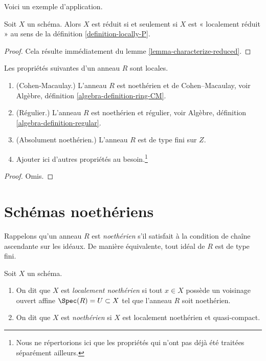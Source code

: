 \noindent
Voici un exemple d'application.

\begin{lemma}
\label{lemma-reduced-is-locally-reduced}
Soit $X$ un schéma. Alors $X$ est réduit si et seulement si $X$ est
« localement réduit » au sens de la définition \ref{definition-locally-P}.
\end{lemma}

\begin{proof}
Cela résulte immédiatement du lemme \ref{lemma-characterize-reduced}.
\end{proof}

\begin{lemma}
\label{lemma-properties-local}
Les propriétés suivantes d'un anneau $R$ sont locales.
\begin{enumerate}
\item (Cohen-Macaulay.)
L'anneau $R$ est noethérien et de
Cohen--Macaulay, voir Algèbre, définition \ref{algebra-definition-ring-CM}.
\item (Régulier.)
L'anneau $R$ est noethérien et régulier, voir
Algèbre, définition \ref{algebra-definition-regular}.
\item (Absolument noethérien.)
L'anneau $R$ est de type fini sur $Z$.
\item Ajouter ici d'autres propriétés au besoin.\footnote{Nous ne répertorions ici que
les propriétés qui n'ont pas déjà été traitées séparément ailleurs.}
\end{enumerate}
\end{lemma}

\begin{proof}
Omis.
\end{proof}















\section{Schémas noethériens}
\label{section-noetherian}

\noindent
Rappelons qu'un anneau $R$ est {\it noethérien} s'il satisfait à la condition de
chaîne ascendante sur les idéaux. De manière équivalente, tout idéal de $R$ est de
type fini.

\begin{definition}
\label{definition-noetherian}
Soit $X$ un schéma.
\begin{enumerate}
\item On dit que $X$ est {\it localement noethérien} si tout
$x \in X$ possède un voisinage ouvert affine
$\Spec(R) = U \subset X$ tel que l'anneau $R$ soit noethérien.
\item On dit que $X$ est {\it noethérien} si $X$ est localement
noethérien et quasi-compact.
\end{enumerate}
\end{definition}

